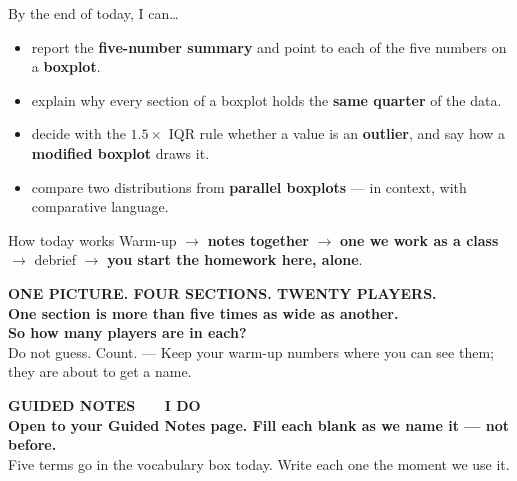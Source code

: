 \documentclass[aspectratio=169, 11pt]{beamer}
\begin{document}
\begin{frame}[t, plain]
  By the end of today, I can\ldots
  \begin{itemize}\setlength{\itemsep}{5pt}
    \item report the \textbf{five-number summary} and point to each of the five numbers on a
          \textbf{boxplot}.
    \item explain why every section of a boxplot holds the \textbf{same quarter} of the data.
    \item decide with the $1.5 \times$ IQR rule whether a value is an \textbf{outlier}, and say
          how a \textbf{modified boxplot} draws it.
    \item compare two distributions from \textbf{parallel boxplots} --- in context, with
          comparative language.
  \end{itemize}
  \begin{block}{How today works}
    Warm-up $\to$ \textbf{notes together} $\to$ \textbf{one we work as a class} $\to$
    debrief $\to$ \textbf{you start the homework here, alone}.
  \end{block}
\end{frame}

{
\begin{frame}[plain]
  \vspace{1.5cm}
  \begin{center}
    {\color{skymid}\bfseries\small ONE PICTURE. FOUR SECTIONS. TWENTY PLAYERS.}\\[0.9cm]
    {\color{white}\bfseries\Large One section is more than five times as wide as
    another.\\[0.4cm] So how many players are in each?}\\[0.9cm]
    {\color{goldacc}\small Do not guess. Count. --- Keep your warm-up numbers where you can
    see them; they are about to get a name.}
  \end{center}
\end{frame}
}

{
\begin{frame}[plain]
  \vspace{1.8cm}\hspace{0.8cm}%
  \begin{minipage}{0.86\textwidth}
    {\color{goldacc}\bfseries\small GUIDED NOTES \ \textbullet\ \ I DO}\\[0.7cm]
    {\color{white}\bfseries\Large Open to your Guided Notes page. Fill each blank as we
    name it --- not before.}\\[0.9cm]
    {\color{skymid}\small Five terms go in the vocabulary box today. Write each one the
    moment we use it.}
  \end{minipage}
\end{frame}
}
\end{document}

